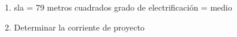 
1.
sla 						= 79 metros cuadrados
grado de electrificaci\'on 	= medio

2. Determinar la corriente de proyecto

